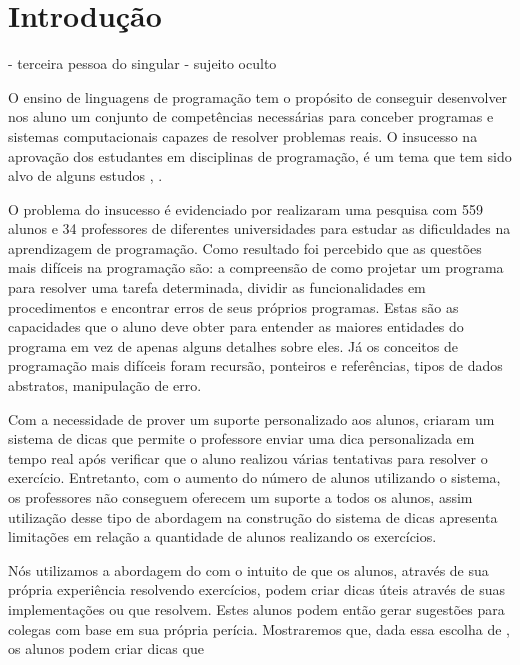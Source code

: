 \chapter{Introdução}

- terceira pessoa do singular - sujeito oculto

O ensino de linguagens de programação tem o propósito de conseguir desenvolver nos aluno um conjunto de competências necessárias para conceber programas e sistemas computacionais capazes de resolver problemas reais. O insucesso na aprovação dos estudantes em disciplinas de programação, é um tema que tem sido alvo de alguns estudos \cite{bosse2015reprovaccoes}, \cite{Cukierman:2015:PSU:2729094.2742623}.

O problema do insucesso é evidenciado por  realizaram uma pesquisa com 559 alunos e 34 professores de diferentes universidades para estudar as dificuldades na aprendizagem de programação. Como resultado foi percebido que as questões mais difíceis na programação são: a compreensão de como projetar um programa para resolver uma tarefa determinada, dividir as funcionalidades em procedimentos e encontrar erros de seus próprios programas. Estas são as capacidades que o aluno deve obter para entender as maiores entidades do programa em vez de apenas alguns detalhes sobre eles. Já os conceitos de programação mais difíceis foram recursão, ponteiros e referências, tipos de dados abstratos, manipulação de erro.


Com a necessidade de prover um suporte personalizado aos alunos,  criaram um sistema de dicas que permite o professore enviar uma dica personalizada em tempo real após verificar que o aluno realizou várias tentativas para resolver o exercício. Entretanto, com o aumento do número de alunos utilizando o sistema, os professores não conseguem oferecem um suporte a todos os alunos, assim utilização desse tipo de abordagem na construção do sistema de dicas apresenta limitações em relação a quantidade de alunos realizando os exercícios.

Nós utilizamos a abordagem do  com o intuito de que os alunos, através de sua própria experiência resolvendo exercícios, podem criar dicas úteis através de suas implementações ou  que resolvem. Estes alunos podem então gerar sugestões para colegas com base em sua própria perícia. Mostraremos que, dada essa escolha de , os alunos podem criar dicas que 

